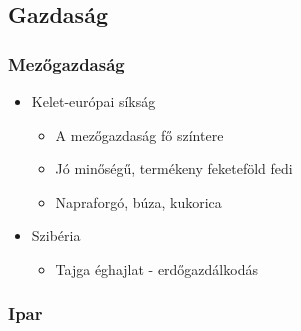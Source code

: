 \documentclass{article}
\begin{document}
\subsection{Gazdaság}

\subsubsection{Mezőgazdaság}
\begin{itemize}
    \item Kelet-európai síkság 
    \begin{itemize}
        \item A mezőgazdaság fő színtere
        \item Jó minőségű, termékeny feketeföld fedi
        \item Napraforgó, búza, kukorica
    \end{itemize}
    \item Szibéria 
    \begin{itemize}
        \item Tajga éghajlat - erdőgazdálkodás
    \end{itemize}
\end{itemize}

\subsubsection{Ipar}
\end{document}
